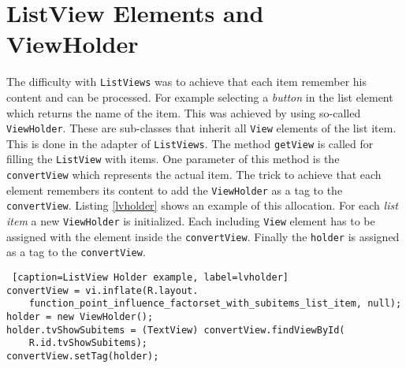\section{ListView Elements and ViewHolder}

The difficulty with \texttt{ListViews} was to achieve that each item remember his content and can be processed. For example selecting a \textit{button} in the list element which returns the name of the item. This was achieved by using so-called \texttt{ViewHolder}. These are sub-classes that inherit all \texttt{View} elements of the list item. This is done in the adapter of \texttt{ListViews}. The method \texttt{getView} is called for filling the \texttt{ListView} with items. One parameter of this method is the \texttt{convertView} which represents the actual item. The trick to achieve that each element remembers its content to add the \texttt{ViewHolder} as a tag to the \texttt{convertView}. Listing \ref{lvholder} shows an example of this allocation. For each \textit{list item} a new \texttt{ViewHolder} is initialized. Each including \texttt{View} element has to be assigned with the element inside the \texttt{convertView}. Finally the \texttt{holder} is assigned as a tag to the \texttt{convertView}.
\begin{lstlisting} [caption=ListView Holder example, label=lvholder] 
convertView = vi.inflate(R.layout.
	function_point_influence_factorset_with_subitems_list_item, null);
holder = new ViewHolder();
holder.tvShowSubitems = (TextView) convertView.findViewById(
	R.id.tvShowSubitems);
convertView.setTag(holder);
\end{lstlisting}
